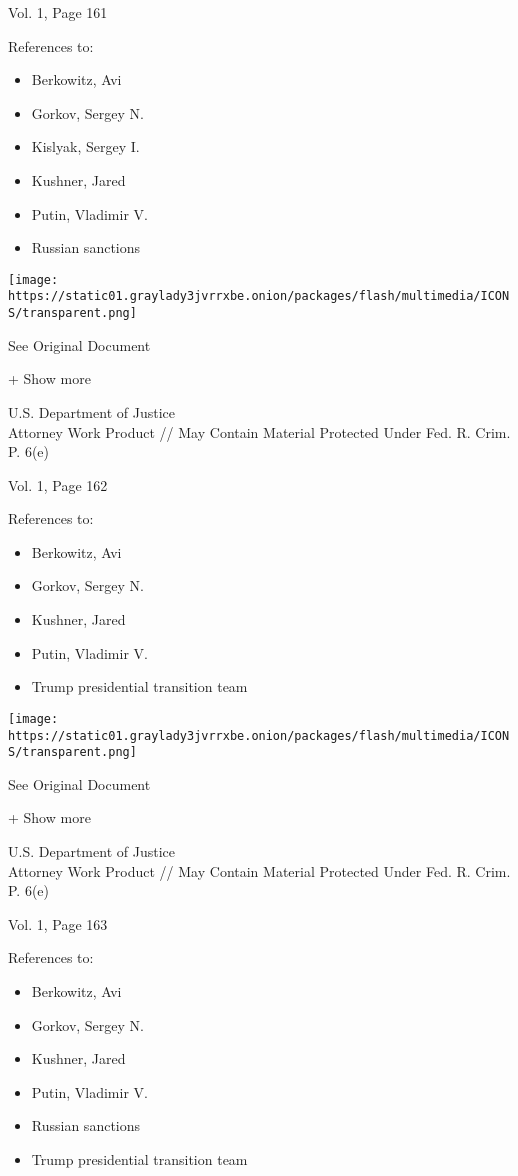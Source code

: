 Vol. 1, Page 161

References to:

\begin{itemize}
\tightlist
\item
  Berkowitz, Avi
\item
  Gorkov, Sergey N.
\item
  Kislyak, Sergey I.
\item
  Kushner, Jared
\item
  Putin, Vladimir V.
\item
  Russian sanctions
\end{itemize}

\protect\hyperlink{}{}

\texttt{[image: https://static01.graylady3jvrrxbe.onion/packages/flash/multimedia/ICONS/transparent.png]}

See Original Document

+ Show more

U.S. Department of Justice\\
Attorney Work Product // May Contain Material Protected Under Fed. R.
Crim. P. 6(e)

Vol. 1, Page 162

References to:

\begin{itemize}
\tightlist
\item
  Berkowitz, Avi
\item
  Gorkov, Sergey N.
\item
  Kushner, Jared
\item
  Putin, Vladimir V.
\item
  Trump presidential transition team
\end{itemize}

\protect\hyperlink{}{}

\texttt{[image: https://static01.graylady3jvrrxbe.onion/packages/flash/multimedia/ICONS/transparent.png]}

See Original Document

+ Show more

U.S. Department of Justice\\
Attorney Work Product // May Contain Material Protected Under Fed. R.
Crim. P. 6(e)

Vol. 1, Page 163

References to:

\begin{itemize}
\tightlist
\item
  Berkowitz, Avi
\item
  Gorkov, Sergey N.
\item
  Kushner, Jared
\item
  Putin, Vladimir V.
\item
  Russian sanctions
\item
  Trump presidential transition team
\end{itemize}

